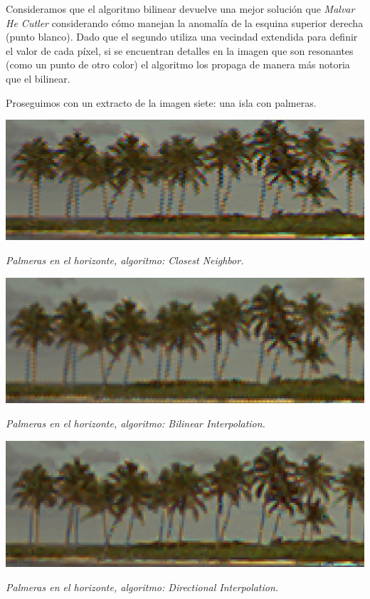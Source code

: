 Consideramos que el algoritmo bilinear devuelve una mejor solución que \textit{Malvar He Cutler} considerando cómo manejan la anomalía de la esquina superior derecha (punto blanco). Dado que el segundo utiliza una vecindad extendida para definir el valor de cada píxel, si se encuentran detalles en la imagen que son resonantes (como un punto de otro color) el algoritmo los propaga de manera más notoria que el bilinear.

Proseguimos con un extracto de la imagen siete: una isla con palmeras.


	\begin{center}
		\includegraphics[scale=.5]{../enunciado/images_files/cualitativo/palms_closest.png}
		\vspace{2pt}
		\par
		\footnotesize\textit{Palmeras en el horizonte, algoritmo: Closest Neighbor.}
	\end{center}


	\begin{center}
		\includegraphics[scale=.5]{../enunciado/images_files/cualitativo/palms_bilinear.png}
		\vspace{2pt}
		\par
		\footnotesize\textit{Palmeras en el horizonte, algoritmo: Bilinear Interpolation.}
	\end{center}


	\begin{center}
		\includegraphics[scale=.5]{../enunciado/images_files/cualitativo/palms_directional.png}
		\vspace{2pt}
		\par
		\footnotesize\textit{Palmeras en el horizonte, algoritmo: Directional Interpolation.}
	\end{center}


